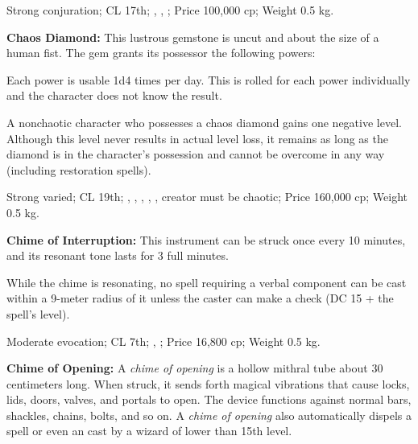Strong conjuration; CL 17th; , , ; Price 100,000 cp; Weight 0.5 kg.



\textbf{Chaos Diamond:} This lustrous gemstone is uncut and about the size of a human fist. The gem grants its possessor the following powers:

\begin{itemize*}
\item {}
\item {}
\item {}
\item {}
\end{itemize*}

Each power is usable 1d4 times per day. This is rolled for each power individually and the character does not know the result.

A nonchaotic character who possesses a chaos diamond gains one negative level. Although this level never results in actual level loss, it remains as long as the diamond is in the character's possession and cannot be overcome in any way (including restoration spells).

Strong varied; CL 19th; , , , , , creator must be chaotic; Price 160,000 cp; Weight 0.5 kg.



\textbf{Chime of Interruption:} This instrument can be struck once every 10 minutes, and its resonant tone lasts for 3 full minutes.

While the chime is resonating, no spell requiring a verbal component can be cast within a 9-meter radius of it unless the caster can make a  check (DC 15 + the spell's level).

Moderate evocation; CL 7th; , ; Price 16,800 cp; Weight 0.5 kg.



\textbf{Chime of Opening:} A \emph{chime of opening} is a hollow mithral tube about 30 centimeters long. When struck, it sends forth magical vibrations that cause locks, lids, doors, valves, and portals to open. The device functions against normal bars, shackles, chains, bolts, and so on. A \emph{chime of opening} also automatically dispels a  spell or even an  cast by a wizard of lower than 15th level.

